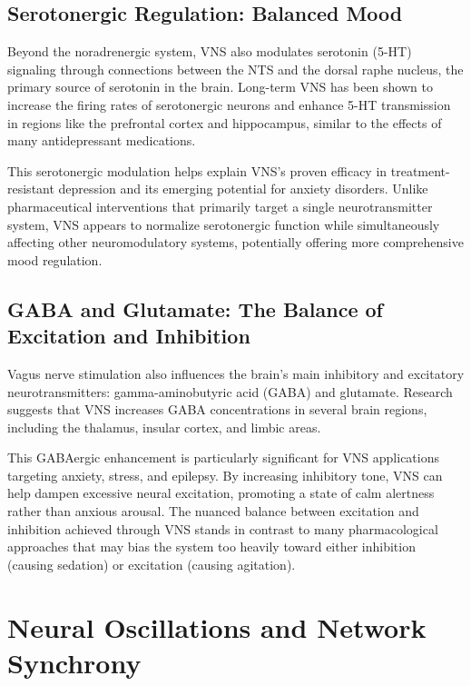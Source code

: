 \documentclass[
  Letterpaper,
]{scrbook}
\begin{document}
\subsection{Serotonergic Regulation: Balanced
Mood}\label{serotonergic-regulation-balanced-mood}

Beyond the noradrenergic system, VNS also modulates serotonin (5-HT)
signaling through connections between the NTS and the dorsal raphe
nucleus, the primary source of serotonin in the brain. Long-term VNS has
been shown to increase the firing rates of serotonergic neurons and
enhance 5-HT transmission in regions like the prefrontal cortex and
hippocampus, similar to the effects of many antidepressant medications.

This serotonergic modulation helps explain VNS's proven efficacy in
treatment-resistant depression and its emerging potential for anxiety
disorders. Unlike pharmaceutical interventions that primarily target a
single neurotransmitter system, VNS appears to normalize serotonergic
function while simultaneously affecting other neuromodulatory systems,
potentially offering more comprehensive mood regulation.

\subsection{GABA and Glutamate: The Balance of Excitation and
Inhibition}\label{gaba-and-glutamate-the-balance-of-excitation-and-inhibition}

Vagus nerve stimulation also influences the brain's main inhibitory and
excitatory neurotransmitters: gamma-aminobutyric acid (GABA) and
glutamate. Research suggests that VNS increases GABA concentrations in
several brain regions, including the thalamus, insular cortex, and
limbic areas.

This GABAergic enhancement is particularly significant for VNS
applications targeting anxiety, stress, and epilepsy. By increasing
inhibitory tone, VNS can help dampen excessive neural excitation,
promoting a state of calm alertness rather than anxious arousal. The
nuanced balance between excitation and inhibition achieved through VNS
stands in contrast to many pharmacological approaches that may bias the
system too heavily toward either inhibition (causing sedation) or
excitation (causing agitation).

\section{Neural Oscillations and Network
Synchrony}\label{neural-oscillations-and-network-synchrony}
\end{document}

